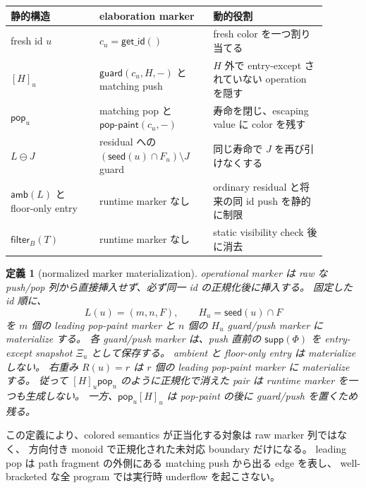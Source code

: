 \documentclass[uplatex,dvipdfmx,a4paper,10.5pt]{jsarticle}
\theoremstyle{jpplain}
\newtheorem{definition}{定義}[section]
\newcommand{\Filter}[2]{\mathsf{filter}_{#1}(#2)}
\newcommand{\takeop}[2]{[#1]_{#2}}
\newcommand{\popop}[1]{\mathsf{pop}_{#1}}
\newcommand{\supp}{\mathsf{supp}}
\newcommand{\guard}{\mathsf{guard}}
\newcommand{\getid}{\mathsf{get\_id}}
\newcommand{\poppaint}{\mathsf{pop\text{-}paint}}
\newcommand{\amb}{\mathsf{amb}}
\newcommand{\seedcap}{\mathsf{seed}}
\begin{document}
\begin{formalbox}[title={static marker と colored marker の対応}]
\begin{center}
\begin{tabular}{>{\raggedright\arraybackslash}p{0.25\linewidth}p{0.32\linewidth}p{0.32\linewidth}}
\toprule
静的構造 & elaboration marker & 動的役割\\
\midrule
fresh id $u$ & $c_u=\getid()$ & fresh color を一つ割り当てる\\
$\takeop{H}{u}$ & $\guard(c_u,H,-)$ と matching push & $H$ 外で entry-except されていない operation を隠す\\
$\popop{u}$ & matching pop と $\poppaint(c_u,-)$ & 寿命を閉じ、escaping value に color を残す\\
$L\ominus J$ & residual への $(\seedcap(u)\cap F_u)\setminus J$ guard & 同じ寿命で $J$ を再び引けなくする\\
$\amb(L)$ と floor-only entry & runtime marker なし & ordinary residual と将来の同 id push を静的に制限\\
$\Filter{B}{T}$ & runtime marker なし & static visibility check 後に消去\\
\bottomrule
\end{tabular}
\end{center}
\end{formalbox}

\begin{definition}[normalized marker materialization]\label{def:marker-materialization}
operational marker は raw な push/pop 列から直接挿入せず、必ず同一 id の正規化後に挿入する。
固定した id 順に、
\[
  L(u)=(m,n,F),\qquad H_u=\seedcap(u)\cap F
\]
を $m$ 個の leading pop-paint marker と $n$ 個の $H_u$ guard/push marker に materialize する。
各 guard/push marker は、push 直前の $\supp(\Phi)$ を entry-except snapshot $\Xi_u$ として保存する。
ambient と floor-only entry は materialize しない。
右重み $R(u)=r$ は $r$ 個の leading pop-paint marker に materialize する。
従って $\takeop{H}{u}\popop{u}$ のように正規化で消えた pair は runtime marker を一つも生成しない。
一方、$\popop{u}\takeop{H}{u}$ は pop-paint の後に guard/push を置くため残る。
\end{definition}

この定義により、colored semantics が正当化する対象は raw marker 列ではなく、
方向付き monoid で正規化された未対応 boundary だけになる。
leading pop は path fragment の外側にある matching push から出る edge を表し、
well-bracketed な全 program では実行時 underflow を起こさない。
\end{document}
